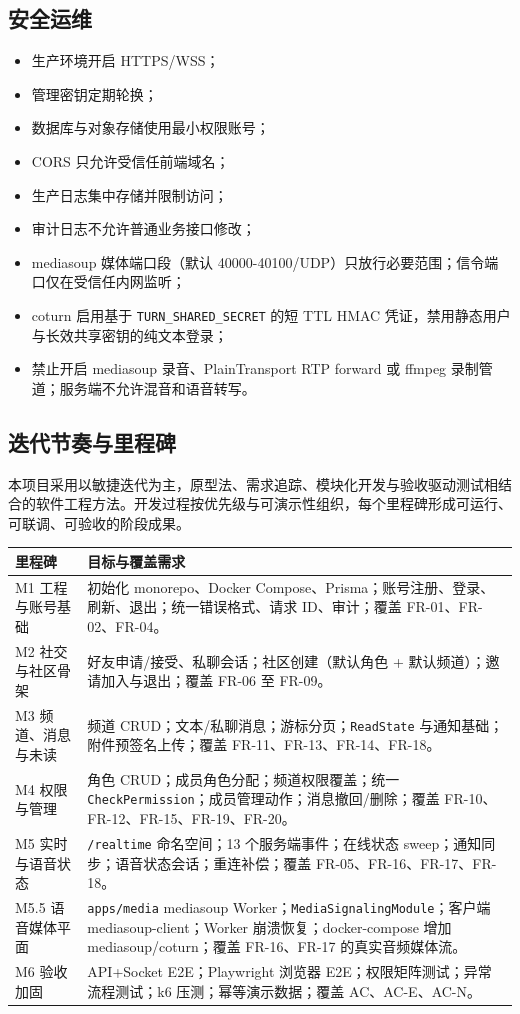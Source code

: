\subsection{安全运维}

\begin{itemize}
  \item 生产环境开启 HTTPS/WSS；
  \item 管理密钥定期轮换；
  \item 数据库与对象存储使用最小权限账号；
  \item CORS 只允许受信任前端域名；
  \item 生产日志集中存储并限制访问；
  \item 审计日志不允许普通业务接口修改；
  \item mediasoup 媒体端口段（默认 40000-40100/UDP）只放行必要范围；信令端口仅在受信任内网监听；
  \item coturn 启用基于 \texttt{TURN\_SHARED\_SECRET} 的短 TTL HMAC 凭证，禁用静态用户与长效共享密钥的纯文本登录；
  \item 禁止开启 mediasoup 录音、PlainTransport RTP forward 或 ffmpeg 录制管道；服务端不允许混音和语音转写。
\end{itemize}

\subsection{迭代节奏与里程碑}

本项目采用以敏捷迭代为主，原型法、需求追踪、模块化开发与验收驱动测试相结合的软件工程方法。开发过程按优先级与可演示性组织，每个里程碑形成可运行、可联调、可验收的阶段成果。

\noindent\begin{tabularx}{\textwidth}{L{3cm}Y}
  \toprule
  里程碑 & 目标与覆盖需求 \\
  \midrule
  M1 工程与账号基础 & 初始化 monorepo、Docker Compose、Prisma；账号注册、登录、刷新、退出；统一错误格式、请求 ID、审计；覆盖 FR-01、FR-02、FR-04。 \\
  M2 社交与社区骨架 & 好友申请/接受、私聊会话；社区创建（默认角色 + 默认频道）；邀请加入与退出；覆盖 FR-06 至 FR-09。 \\
  M3 频道、消息与未读 & 频道 CRUD；文本/私聊消息；游标分页；\texttt{ReadState} 与通知基础；附件预签名上传；覆盖 FR-11、FR-13、FR-14、FR-18。 \\
  M4 权限与管理 & 角色 CRUD；成员角色分配；频道权限覆盖；统一 \texttt{CheckPermission}；成员管理动作；消息撤回/删除；覆盖 FR-10、FR-12、FR-15、FR-19、FR-20。 \\
  M5 实时与语音状态 & \texttt{/realtime} 命名空间；13 个服务端事件；在线状态 sweep；通知同步；语音状态会话；重连补偿；覆盖 FR-05、FR-16、FR-17、FR-18。 \\
  M5.5 语音媒体平面 & \texttt{apps/media} mediasoup Worker；\texttt{MediaSignalingModule}；客户端 mediasoup-client；Worker 崩溃恢复；docker-compose 增加 mediasoup/coturn；覆盖 FR-16、FR-17 的真实音频媒体流。 \\
  M6 验收加固 & API+Socket E2E；Playwright 浏览器 E2E；权限矩阵测试；异常流程测试；k6 压测；幂等演示数据；覆盖 AC、AC-E、AC-N。 \\
  \bottomrule
\end{tabularx}

